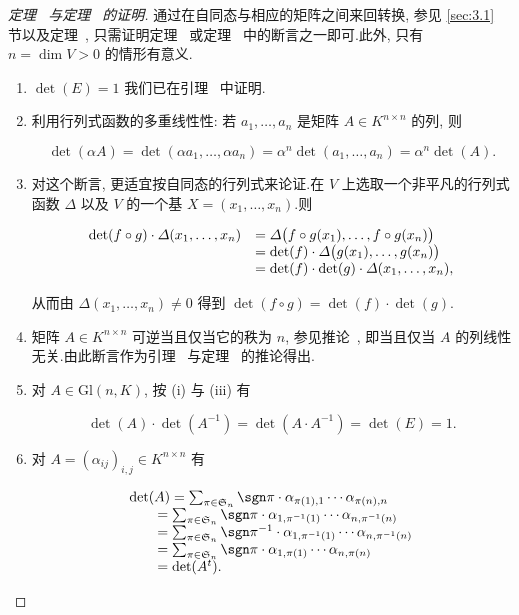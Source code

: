 \begin{proof}[定理~ 与定理~ 的证明]
通过在自同态与相应的矩阵之间来回转换, 参见 \ref{sec:3.1} 节以及定理~, 只需证明定理~ 或定理~ 中的断言之一即可.此外, 只有 $n = \dim V > 0$ 的情形有意义.
\begin{enumerate}
\item[(i)] $\det(E) = 1$ 我们已在引理~ 中证明.
\item[(ii)] 利用行列式函数的多重线性性: 若 $a_1, \ldots, a_n$ 是矩阵 $A \in K^{n \times n}$ 的列, 则

\[
\det(\alpha A) = \det(\alpha a_1, \ldots, \alpha a_n) = \alpha^n \det(a_1, \ldots, a_n) = \alpha^n \det(A).
\]

\item[(iii)] 对这个断言, 更适宜按自同态的行列式来论证.在 $V$ 上选取一个非平凡的行列式函数 $\varDelta$ 以及 $V$ 的一个基 $X = (x_1, \ldots, x_n)$.则

\[
\begin{array}{r l}
\det(f \circ g) \cdot \varDelta(x_1, \ldots, x_n) & = \varDelta\big(f \circ g(x_1), \ldots, f \circ g(x_n)\big) \\
& = \det(f) \cdot \varDelta\big(g(x_1), \ldots, g(x_n)\big) \\
& = \det(f) \cdot \det(g) \cdot \varDelta(x_1, \ldots, x_n),
\end{array}
\]

从而由 $\varDelta(x_1, \ldots, x_n) \neq 0$ 得到 $\det(f \circ g) = \det(f) \cdot \det(g)$.

\item[(iv)] 矩阵 $A \in K^{n \times n}$ 可逆当且仅当它的秩为 $n$, 参见推论~, 即当且仅当 $A$ 的列线性无关.由此断言作为引理~ 与定理~ 的推论得出.

\item[(v)] 对 $A \in \mathrm{Gl}(n, K)$, 按 (i) 与 (iii) 有

\[
\det(A) \cdot \det(A^{-1}) = \det(A \cdot A^{-1}) = \det(E) = 1.
\]

\item[(vi)] 对 $A = (\alpha_{ij})_{i, j} \in K^{n \times n}$ 有

\[
\begin{array}{l}
\det(A) = \sum_{\pi \in \mathfrak{S}_n} \sgn \pi \cdot \alpha_{\pi(1), 1} \cdots \alpha_{\pi(n), n} \\
\qquad = \sum_{\pi \in \mathfrak{S}_n} \sgn \pi \cdot \alpha_{1, \pi^{-1}(1)} \cdots \alpha_{n, \pi^{-1}(n)} \\
\qquad = \sum_{\pi \in \mathfrak{S}_n} \sgn \pi^{-1} \cdot \alpha_{1, \pi^{-1}(1)} \cdots \alpha_{n, \pi^{-1}(n)} \\
\qquad = \sum_{\pi \in \mathfrak{S}_n} \sgn \pi \cdot \alpha_{1, \pi(1)} \cdots \alpha_{n, \pi(n)} \\
\qquad = \det(A^t).
\end{array}
\]
\end{enumerate}
\end{proof}

